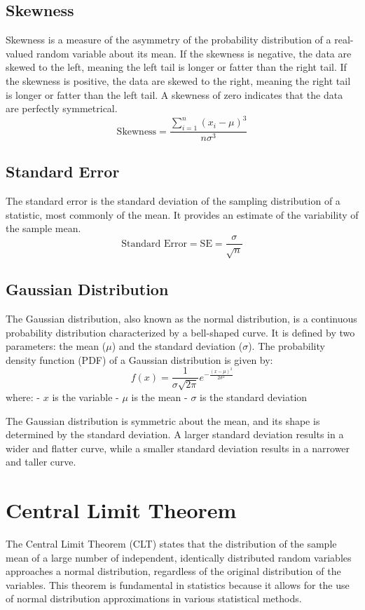 \documentclass{article}
\begin{document}
\subsection{Skewness}
Skewness is a measure of the asymmetry of the probability distribution of a real-valued random variable about its mean. If the skewness is negative, the data are skewed to the left, meaning the left tail is longer or fatter than the right tail. If the skewness is positive, the data are skewed to the right, meaning the right tail is longer or fatter than the left tail. A skewness of zero indicates that the data are perfectly symmetrical.
\[
\text{Skewness} = \frac{\sum_{i=1}^{n} (x_i - \mu)^3}{n \sigma^3}
\]

\subsection{Standard Error}
The standard error is the standard deviation of the sampling distribution of a statistic, most commonly of the mean. It provides an estimate of the variability of the sample mean.
\[
\text{Standard Error} = \text{SE} = \frac{\sigma}{\sqrt{n}}
\]

\subsection{Gaussian Distribution}
The Gaussian distribution, also known as the normal distribution, is a continuous probability distribution characterized by a bell-shaped curve. It is defined by two parameters: the mean ($\mu$) and the standard deviation ($\sigma$). The probability density function (PDF) of a Gaussian distribution is given by:
\[
f(x) = \frac{1}{\sigma \sqrt{2\pi}} e^{-\frac{(x - \mu)^2}{2\sigma^2}}
\]
where:
- $x$ is the variable
- $\mu$ is the mean
- $\sigma$ is the standard deviation

The Gaussian distribution is symmetric about the mean, and its shape is determined by the standard deviation. A larger standard deviation results in a wider and flatter curve, while a smaller standard deviation results in a narrower and taller curve.

\section{Central Limit Theorem}
The Central Limit Theorem (CLT) states that the distribution of the sample mean of a large number of independent, identically distributed random variables approaches a normal distribution, regardless of the original distribution of the variables. This theorem is fundamental in statistics because it allows for the use of normal distribution approximations in various statistical methods.
\end{document}
